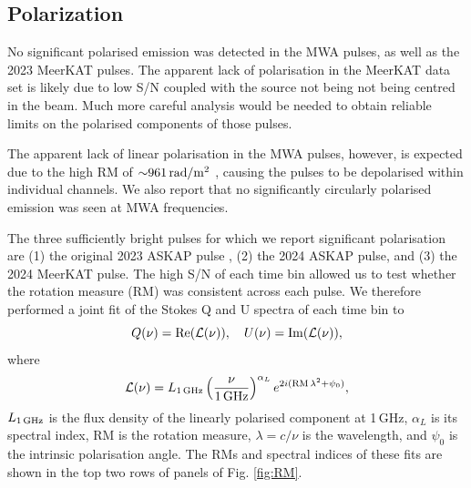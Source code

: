 \documentclass[preprint2,linenumbers]{aastex631}
\begin{document}

\subsection{Polarization} \label{sec:polarization}

No significant polarised emission was detected in the MWA pulses, as well as the 2023 MeerKAT pulses.
The apparent lack of polarisation in the MeerKAT data set is likely due to low S/N coupled with the source not being not being centred in the beam.
Much more careful analysis would be needed to obtain reliable limits on the polarised components of those pulses.

The apparent lack of linear polarisation in the MWA pulses, however, is expected due to the high RM of ${\sim}961\,{\rm rad}/{\rm m}^2$ , causing the pulses to be depolarised within individual channels.
We also report that no significantly circularly polarised emission was seen at MWA frequencies.

The three sufficiently bright pulses for which we report significant polarisation are (1) the original 2023 ASKAP pulse , (2) the 2024 ASKAP pulse, and (3) the 2024 MeerKAT pulse.
The high S/N of each time bin allowed us to test whether the rotation measure (RM) was consistent across each pulse.
We therefore performed a joint fit of the Stokes Q and U spectra of each time bin to
\begin{equation}
    Q(\nu) = {\rm Re}(\mathcal{L}(\nu)),
    \quad
    U(\nu) = {\rm Im}(\mathcal{L}(\nu)),
    \label{eqn:RM}
\end{equation}
where
\begin{equation}
    \mathcal{L}(\nu)
        = L_{\rm 1\,GHz}\left(\frac{\nu}{\rm 1\,GHz}\right)^{\alpha_L} e^{2i({\rm RM}\,\lambda^2 + \psi_0)},
\end{equation}
$L_{\rm 1\,GHz}$ is the flux density of the linearly polarised component at 1\,GHz, $\alpha_L$ is its spectral index, RM is the rotation measure, $\lambda = c/\nu$ is the wavelength, and $\psi_0$ is the intrinsic polarisation angle.
The RMs and spectral indices of these fits are shown in the top two rows of panels of Fig. \ref{fig:RM}.
\end{document}
